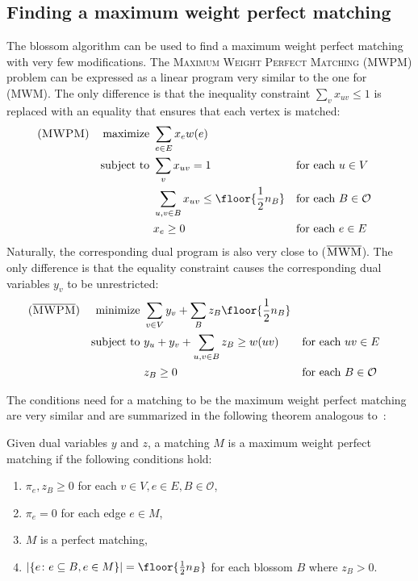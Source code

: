 \subsection{Finding a maximum weight perfect matching}

The blossom algorithm can be used to find a maximum weight perfect matching with very few modifications. The \textsc{Maximum Weight Perfect Matching} \textsc{(MWPM)} problem can be expressed as a linear program very similar to the one for \textsc{(MWM)}. The only difference is that the inequality constraint $\sum_v x_{uv} \leq 1$ is replaced with an equality that ensures that each vertex is matched:
\begin{align*}
(\textsc{MWPM})
&& \text{maximize }   & \sum_{e \in E} x_e w(e)\\
&& \text{subject to } & \sum_v x_{uv} = 1                                    && \text{for each $u \in V$} \\
&&                    & \sum_{u, v \in B} x_{uv} \leq \floor{\frac{1}{2}n_B} && \text{for each $B \in \mathcal{O}$} \\
&&                    & x_e \geq 0                                           && \text{for each $e \in E$}
\end{align*}
Naturally, the corresponding dual program is also very close to ($\overline{\textsc{MWM}}$). The only difference is that the equality constraint causes the corresponding dual variables $y_v$ to be unrestricted:
\begin{align*}
(\overline{\textsc{MWPM}})
&& \text{minimize }   & \sum_{v\in V}y_v + \sum_{B} z_B \floor{\frac{1}{2}n_B} \\
&& \text{subject to } & y_u + y_v + \sum_{u, v \in B} z_B \geq w(uv) && \text{for each $uv \in E$} \\
&&                    & z_B \geq 0                                   && \text{for each $B \in \mathcal{O}$}
\end{align*}

The conditions need for a matching to be the maximum weight perfect matching are very similar and are summarized in the following theorem analogous to~:

\begin{theorem}\label{thm:conditions_perfect}
    Given dual variables $y$ and $z$, a matching $M$ is a maximum weight perfect matching if the following conditions hold:
    
    \begin{enumerate}
        \item $\pi_{e}, z_B \geq 0$ for each $v \in V, e \in E, B \in \mathcal{O}$,
        \item $\pi_{e} = 0$ for each edge $e \in M$,
        \item $M$ is a perfect matching,
        \item $|\{e \colon e \subseteq B, e \in M\}| = \floor{\frac{1}{2}n_B}$ for each blossom $B$ where $z_B > 0$.
    \end{enumerate}
\end{theorem}

